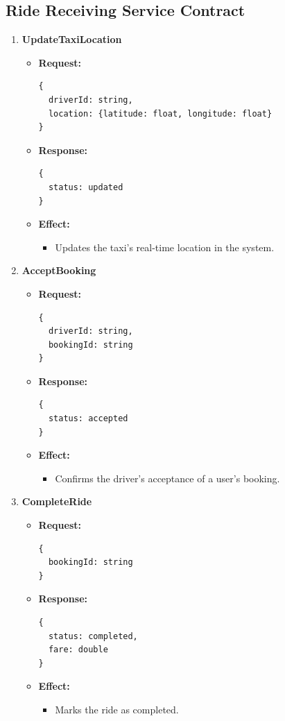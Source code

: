 \documentclass[a4paper,12pt]{article}
\begin{document}
\subsection*{Ride Receiving Service Contract}

\begin{enumerate}
  \item \textbf{UpdateTaxiLocation}
    \begin{itemize}
      \item \textbf{Request:}
      \begin{verbatim}
{
  driverId: string,
  location: {latitude: float, longitude: float}
}
      \end{verbatim}
      \item \textbf{Response:}
      \begin{verbatim}
{
  status: updated
}
      \end{verbatim}
      \item \textbf{Effect:}
      \begin{itemize}
        \item Updates the taxi's real-time location in the system.
      \end{itemize}
    \end{itemize}

  \item \textbf{AcceptBooking}
    \begin{itemize}
      \item \textbf{Request:}
      \begin{verbatim}
{
  driverId: string,
  bookingId: string
}
      \end{verbatim}
      \item \textbf{Response:}
      \begin{verbatim}
{
  status: accepted
}
      \end{verbatim}
      \item \textbf{Effect:}
      \begin{itemize}
        \item Confirms the driver’s acceptance of a user’s booking.
      \end{itemize}
    \end{itemize}

  \item \textbf{CompleteRide}
    \begin{itemize}
      \item \textbf{Request:}
      \begin{verbatim}
{
  bookingId: string
}
      \end{verbatim}
      \item \textbf{Response:}
      \begin{verbatim}
{
  status: completed,
  fare: double
}
      \end{verbatim}
      \item \textbf{Effect:}
      \begin{itemize}
        \item Marks the ride as completed.
      \end{itemize}
    \end{itemize}
\end{enumerate}
\end{document}
